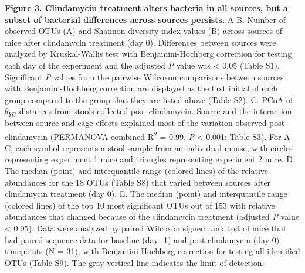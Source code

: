 \documentclass[
  11pt,
]{article}
\begin{document}
\textbf{Figure 3. Clindamycin treatment alters bacteria in all sources,
but a subset of bacterial differences across sources persists.} A-B.
Number of observed OTUs (A) and Shannon diversity index values (B)
across sources of mice after clindamycin treatment (day 0). Differences
between sources were analyzed by Kruskal-Wallis test with
Benjamini-Hochberg correction for testing each day of the experiment and
the adjusted \emph{P} value was \textless{} 0.05 (Table S1). Significant
\emph{P} values from the pairwise Wilcoxon comparisons between sources
with Benjamini-Hochberg correction are displayed as the first initial of
each group compared to the group that they are listed above (Table S2).
C. PCoA of \(\theta_{YC}\) distances from stools collected
post-clindamycin. Source and the interaction between source and cage
effects explained most of the variation observed post-clindamycin
(PERMANOVA combined R\textsuperscript{2} = 0.99, \emph{P} \textless{}
0.001; Table S3). For A-C, each symbol represents a stool sample from an
individual mouse, with circles representing experiment 1 mice and
triangles representing experiment 2 mice. D. The median (point) and
interquantile range (colored lines) of the relative abundances for the
18 OTUs (Table S8) that varied between sources after clindamycin
treatment (day 0). E. The median (point) and interquantile range
(colored lines) of the top 10 most significant OTUs out of 153 with
relative abundances that changed because of the clindamycin treatment
(adjusted \emph{P} value \textless{} 0.05). Data were analyzed by paired
Wilcoxon signed rank test of mice that had paired sequence data for
baseline (day -1) and post-clindamycin (day 0) timepoints (N = 31), with
Benjamini-Hochberg correction for testing all identified OTUs (Table
S9). The gray vertical line indicates the limit of detection.

\newpage
\end{document}
